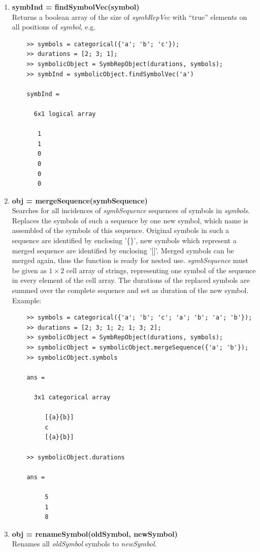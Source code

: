 \documentclass[a4]{scrreprt}
\begin{document}
\begin{enumerate}
	\item \textbf{symbInd = findSymbolVec(symbol)}\\
	Returns a boolean array of the size of \textit{symbRepVec} with ``true'' elements on all positions of \textit{symbol}, e.g.
	\begin{verbatim}
	>> symbols = categorical({'a'; 'b'; 'c'});
	>> durations = [2; 3; 1];
	>> symbolicObject = SymbRepObject(durations, symbols);
	>> symbInd = symbolicObject.findSymbolVec('a')
	
	symbInd =
	
	  6x1 logical array
	
	   1
	   1
	   0
	   0
	   0
	   0
	\end{verbatim}
	
	\item \textbf{obj = mergeSequence(symbSequence)}\\
	Searches for all incidences of \textit{symbSequence} sequences of symbols in \textit{symbols}. Replaces the symbols of such a sequence by one new symbol, which name is assembled of the symbols of this sequence. Original symbols in such a sequence are identified by enclosing '\{\}', new symbols which represent a merged sequence are identified by enclosing '[]'. Merged symbols can be merged again, thus the function is ready for nested use. \textit{symbSequence} must be given as $1 \times 2$ cell array of strings, representing one symbol of the sequence in every element of the cell array. The durations of the replaced symbols are summed over the complete sequence and set as duration of the new symbol.
	Example:
	\begin{verbatim}
	>> symbols = categorical({'a'; 'b'; 'c'; 'a'; 'b'; 'a'; 'b'});
	>> durations = [2; 3; 1; 2; 1; 3; 2];
	>> symbolicObject = SymbRepObject(durations, symbols);
	>> symbolicObject = symbolicObject.mergeSequence({'a'; 'b'});
	>> symbolicObject.symbols
	
	ans = 
	
	  3x1 categorical array
	
	     [{a}{b}] 
	     c 
	     [{a}{b}] 
	
	>> symbolicObject.durations
	
	ans =
	
	     5
	     1
	     8	
	\end{verbatim}
	
	\item \textbf{obj = renameSymbol(oldSymbol, newSymbol)}\\
	Renames all \textit{oldSymbol} symbols to \textit{newSymbol}.
	

\end{enumerate}
\end{document}
